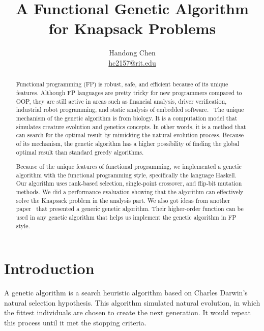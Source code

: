 \documentclass[sigconf]{acmart}
\begin{document}
\title{A Functional Genetic Algorithm for Knapsack Problems}

\author{Handong Chen \\  \href{mailto:hc2157@rit.edu}{hc2157@rit.edu}}

\begin{abstract}
Functional programming (FP) is robust, safe, and efficient because of its unique features. Although FP languages are pretty tricky for new programmers compared to OOP, they are still active in areas such as financial analysis, driver verification, industrial robot programming, and static analysis of embedded software.~\cite{paper1}
The unique mechanism of the genetic algorithm is from biology. It is a computation model that simulates creature evolution and genetics concepts. In other words, it is a method that can search for the optimal result by mimicking the natural evolution process. Because of its mechanism, the genetic algorithm has a higher possibility of finding the global optimal result than standard greedy algorithms. 

Because of the unique features of functional programming, we implemented a genetic algorithm with the functional programming style, specifically the language Haskell. Our algorithm uses rank-based selection, single-point crossover, and flip-bit mutation methods. We did a performance evaluation showing that the algorithm can effectively solve the Knapsack problem in the analysis part. We also got ideas from another paper~\cite{choosenPaper} that presented a generic genetic algorithm. Their higher-order function can be used in any genetic algorithm that helps us implement the genetic algorithm in FP style.
\end{abstract}


\maketitle

\section{Introduction}
\label{intro}

A genetic algorithm is a search heuristic algorithm based on Charles Darwin's natural selection hypothesis. This algorithm simulated natural evolution, in which the fittest individuals are chosen to create the next generation. It would repeat this process until it met the stopping criteria.
\end{document}
